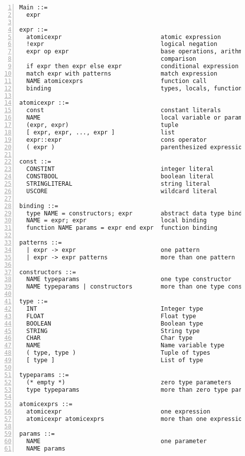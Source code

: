 \begin{Verbatim}[numbers=left,xleftmargin=\parindent]
Main ::=
  expr

expr ::=
  atomicexpr                            atomic expression
  !expr                                 logical negation
  expr op expr                          base operations, arithmetic, 
                                        comparison
  if expr then expr else expr           conditional expression
  match expr with patterns              match expression
  NAME atomicexprs                      function call
  binding                               types, locals, functions

atomicexpr ::=
  const                                 constant literals
  NAME                                  local variable or parameter
  (expr, expr)                          tuple
  [ expr, expr, ..., expr ]             list
  expr::expr                            cons operator
  ( expr )                              parenthesized expression

const ::=
  CONSTINT                              integer literal
  CONSTBOOL                             boolean literal
  STRINGLITERAL                         string literal
  USCORE                                wildcard literal

binding ::=
  type NAME = constructors; expr        abstract data type binding
  NAME = expr; expr                     local binding
  function NAME params = expr end expr  function binding

patterns ::=
  | expr -> expr                        one pattern
  | expr -> expr patterns               more than one pattern

constructors ::=
  NAME typeparams                       one type constructor
  NAME typeparams | constructors        more than one type constructor

type ::=
  INT                                   Integer type
  FLOAT                                 Float type
  BOOLEAN                               Boolean type
  STRING                                String type
  CHAR                                  Char type
  NAME                                  Name variable type
  ( type, type )                        Tuple of types
  [ type ]                              List of type
  
typeparams ::=
  (* empty *)                           zero type parameters
  type typeparams                       more than zero type parameters

atomicexprs ::=
  atomicexpr                            one expression
  atomicexpr atomicexprs                more than one expression

params ::=
  NAME                                  one parameter
  NAME params
\end{Verbatim}
